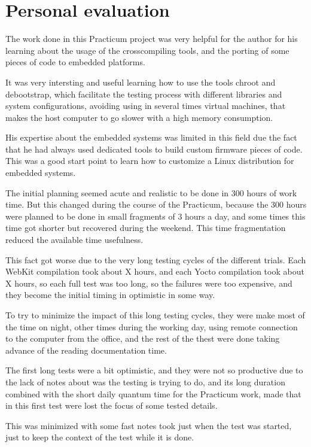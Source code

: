 \documentclass[a4paper,11pt,openany]{report}
\begin{document}
\chapter{Personal evaluation}
The work done in this Practicum project was very helpful for the author for his learning about the usage of the crosscompiling tools, and the porting of some pieces of code to embedded platforms.

It was very intersting and useful learning how to use the tools chroot and debootstrap, which facilitate the testing process with different libraries and system configurations, avoiding using in several times virtual machines, that makes the host computer to go slower with a high memory consumption.

His expertise about the embedded systems was limited in this field due the fact that he had always used dedicated tools to build custom firmware pieces of code. This was a good start point to learn how to customize a Linux distribution for embedded systems.

The initial planning seemed acute and realistic to be done in 300 hours of work time. But this changed during the course of the Practicum, because the 300 hours were planned to be done in small fragments of 3 hours a day, and some times this time got shorter but recovered during the weekend. This time fragmentation reduced the available time usefulness.

This fact got worse due to the very long testing cycles of the different trials. Each WebKit compilation took about X hours, and each Yocto compilation took about X hours, so each full test was too long, so the failures were too expensive, and they become the initial timing in optimistic in some way.

To try to minimize the impact of this long testing cycles, they were make most of the time on night, other times during the working day, using remote connection to the computer from the office, and the rest of the thest were done taking advance of the reading documentation time.

The first long tests were a bit optimistic, and they were not so productive due to the lack of notes about was the testing is trying to do, and its long duration combined with the short daily quantum time for the Practicum work, made that in this first test were lost the focus of some tested details.

This was minimized with some fast notes took just when the test was started, just to keep the context of the test while it is done.
\end{document}
